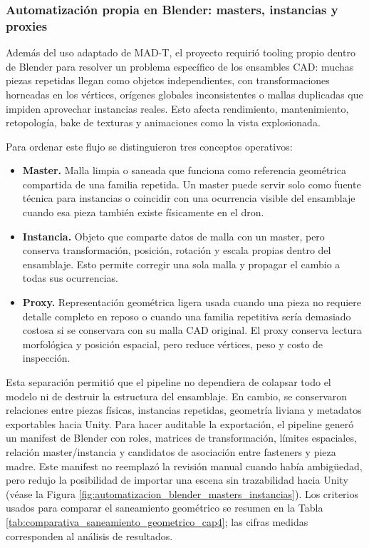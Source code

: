 \subsubsection{Automatización propia en Blender: masters, instancias y proxies}

Además del uso adaptado de MAD-T, el proyecto requirió tooling propio dentro de Blender para resolver un problema específico de los ensambles CAD: muchas piezas repetidas llegan como objetos independientes, con transformaciones horneadas en los vértices, orígenes globales inconsistentes o mallas duplicadas que impiden aprovechar instancias reales. Esto afecta rendimiento, mantenimiento, retopología, bake de texturas y animaciones como la vista explosionada.

Para ordenar este flujo se distinguieron tres conceptos operativos:
\begin{itemize}
    \item \textbf{Master.} Malla limpia o saneada que funciona como referencia geométrica compartida de una familia repetida. Un master puede servir solo como fuente técnica para instancias o coincidir con una ocurrencia visible del ensamblaje cuando esa pieza también existe físicamente en el dron.
    \item \textbf{Instancia.} Objeto que comparte datos de malla con un master, pero conserva transformación, posición, rotación y escala propias dentro del ensamblaje. Esto permite corregir una sola malla y propagar el cambio a todas sus ocurrencias.
    \item \textbf{Proxy.} Representación geométrica ligera usada cuando una pieza no requiere detalle completo en reposo o cuando una familia repetitiva sería demasiado costosa si se conservara con su malla CAD original. El proxy conserva lectura morfológica y posición espacial, pero reduce vértices, peso y costo de inspección.
\end{itemize}

Esta separación permitió que el pipeline no dependiera de colapsar todo el modelo ni de destruir la estructura del ensamblaje. En cambio, se conservaron relaciones entre piezas físicas, instancias repetidas, geometría liviana y metadatos exportables hacia Unity. Para hacer auditable la exportación, el pipeline generó un manifest de Blender con roles, matrices de transformación, límites espaciales, relación master/instancia y candidatos de asociación entre fasteners y pieza madre. Este manifest no reemplazó la revisión manual cuando había ambigüedad, pero redujo la posibilidad de importar una escena sin trazabilidad hacia Unity (véase la Figura \ref{fig:automatizacion_blender_masters_instancias}). Los criterios usados para comparar el saneamiento geométrico se resumen en la Tabla \ref{tab:comparativa_saneamiento_geometrico_cap4}; las cifras medidas corresponden al análisis de resultados.

